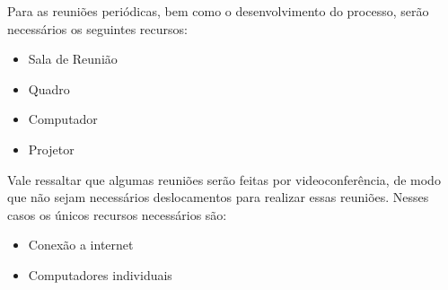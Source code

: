 Para as reuniões periódicas, bem como o desenvolvimento do processo, serão necessários os seguintes recursos: 

\begin{itemize}
	\item Sala de Reunião
	\item Quadro
	\item Computador
	\item Projetor
\end{itemize}

Vale ressaltar que algumas reuniões serão feitas por videoconferência, de modo que não sejam necessários deslocamentos para realizar essas reuniões. Nesses casos os únicos recursos necessários são:

\begin{itemize}
	\item Conexão a internet
	\item Computadores individuais
\end{itemize}